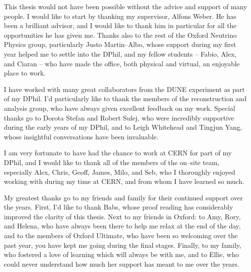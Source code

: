 This thesis would not have been possible without the advice and support of many
people. I would like to start by thanking my supervisor, Alfons Weber. He has
been a brilliant advisor, and I would like to thank him in particular for all
the opportunities he has given me. Thanks also to the rest of the Oxford
Neutrino Physics group, particularly Justo Martin--Albo, whose support during 
my first year helped me to settle into the DPhil, and my fellow students -- 
Fabio, Alex, and Ciaran -- who have made the office, both physical and 
virtual, an enjoyable place to work.

\medskip\noindent
I have worked with many great collaborators from the DUNE experiment
as part of my DPhil. I'd particularly like to thank the members of the 
\protodune{} reconstruction and analysis group, who have always given 
excellent feedback on my work. Special thanks go to Dorota Stefan and Robert 
Sulej, who were incredibly supportive during the early years of my DPhil, and 
to Leigh Whitehead and Tingjun Yang, whose insightful conversations have been 
invaluable. 

\medskip\noindent
I am very fortunate to have had the chance to work at CERN for part of my DPhil,
and I would like to thank all of the members of the on--site \protodune{} 
team, especially Alex, Chris, Geoff, James, Milo, and Seb, who I thoroughly 
enjoyed working with during my time at CERN, and from whom I have learned so 
much. 

\medskip\noindent
My greatest thanks go to my friends and family for their continued support 
over the years. First, I'd like to thank Babs, whose proof reading has
considerably improved the clarity of this thesis. Next to my friends in 
Oxford: to Amy, Rory, and Helena, who have always been there to help me relax 
at the end of the day, and to the members of Oxford Ultimate, who have been so 
welcoming over the past year, you have kept me going during the final stages. 
Finally, to my family, who fostered a love of learning which will always be 
with me, and to Ellie, who could never understand how much her support has 
meant to me over the years.
